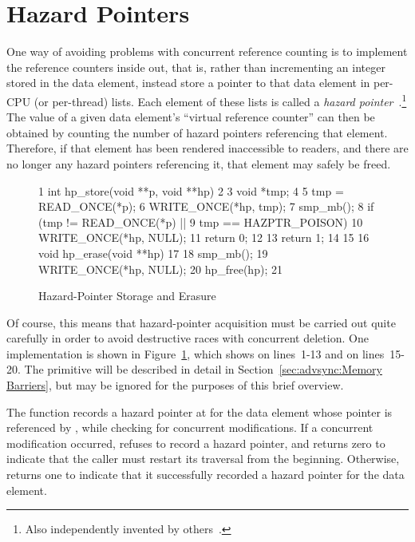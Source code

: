 
\section{Hazard Pointers}
\label{sec:defer:Hazard Pointers}

One way of avoiding problems with concurrent reference counting
is to implement the reference counters
inside out, that is, rather than incrementing an integer stored in the
data element, instead store a pointer to that data element in
per-CPU (or per-thread) lists.
Each element of these lists is called a
\emph{hazard pointer}~\cite{MagedMichael04a}.\footnote{
	Also independently invented by others~\cite{HerlihyLM02}.}
The value of a given data element's ``virtual reference counter'' can
then be obtained by counting the number of hazard pointers referencing
that element.
Therefore, if that element has been rendered inaccessible to readers,
and there are no longer any hazard pointers referencing it, that element
may safely be freed.

\begin{figure}[btp]
{ \scriptsize
\begin{verbbox}
 1 int hp_store(void **p, void **hp)
 2 {
 3   void *tmp;
 4 
 5   tmp = READ_ONCE(*p);
 6   WRITE_ONCE(*hp, tmp);
 7   smp_mb();
 8   if (tmp != READ_ONCE(*p) ||
 9       tmp == HAZPTR_POISON) {
10     WRITE_ONCE(*hp, NULL);
11     return 0;
12   }
13   return 1;
14 }
15 
16 void hp_erase(void **hp)
17 {
18   smp_mb();
19   WRITE_ONCE(*hp, NULL);
20   hp_free(hp);
21 }
\end{verbbox}
}
\centering
\theverbbox
\caption{Hazard-Pointer Storage and Erasure}
\label{fig:defer:Hazard-Pointer Storage and Erasure}
\end{figure}

Of course, this means that hazard-pointer acquisition must be carried
out quite carefully in order to avoid destructive races with concurrent
deletion.
One implementation is shown in
Figure~\ref{fig:defer:Hazard-Pointer Storage and Erasure},
which shows  on lines~1-13 and  on
lines~15-20.
The  primitive will be described in detail in
Section~\ref{sec:advsync:Memory Barriers}, but may be ignored for
the purposes of this brief overview.

The  function records a hazard pointer at  for the data
element whose pointer is referenced by , while checking for
concurrent modifications.
If a concurrent modification occurred,  refuses to record
a hazard pointer, and returns zero to indicate that the caller must
restart its traversal from the beginning.
Otherwise,  returns one to indicate that it successfully
recorded a hazard pointer for the data element.

